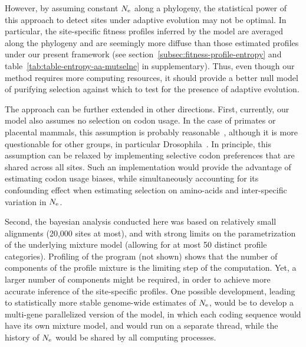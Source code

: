 However, by assuming constant $N_{\text{e}}$ along a phylogeny, the statistical power of this approach to detect sites under adaptive evolution may not be optimal.
In particular, the site-specific fitness profiles inferred by the model are averaged along the phylogeny and are seemingly more diffuse than those estimated profiles under our present framework (see section~\ref{subsec:fitness-profile-entropy} and table~\ref{tab:table-entropy-aa-mutselne} in supplementary).
Thus, even though our method requires more computing resources, it should provide a better null model of purifying selection against which to test for the presence of adaptive evolution.

The approach can be further extended in other directions.
First, currently, our model also assumes no selection on codon usage.
In the case of primates or placental mammals, this assumption is probably reasonable~\citep{Yang2008}, although it is more questionable for other groups, in particular Drosophila~\citep{Duret1999,Plotkin2011}.
In principle, this assumption can be relaxed by implementing selective codon preferences that are shared across all sites.
Such an implementation would provide the advantage of estimating codon usage biases, while simultaneously accounting for its confounding effect when estimating selection on amino-acids and inter-specific variation in $N_{\text{e}}$.

Second, the bayesian analysis conducted here was based on relatively small alignments (20,000 sites at most), and with strong limits on the parametrization of the underlying mixture model (allowing for at most 50 distinct profile categories).
Profiling of the program (not shown) shows that the number of components of the profile mixture is the limiting step of the computation.
Yet, a larger number of components might be required, in order to achieve more accurate inference of the site-specific profiles.
One possible development, leading to statistically more stable genome-wide estimates of $N_{\text{e}}$, would be to develop a multi-gene parallelized version of the model, in which each coding sequence would have its own mixture model, and would run on a separate thread, while the history of $N_{\text{e}}$ would be shared by all computing processes.

